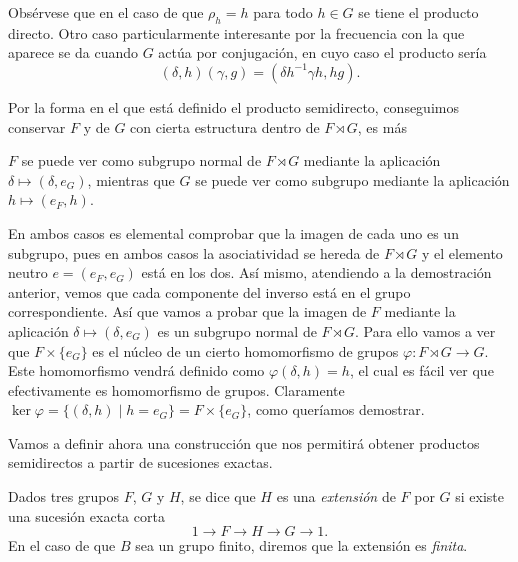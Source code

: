 \documentclass[TFG.tex]{subfiles}
\begin{document}
 Obsérvese que en el caso de que $\rho_h=h$ para todo $h\in G$ se tiene el producto directo. Otro caso particularmente interesante por la frecuencia con la que aparece se da cuando $G$ actúa por conjugación, en cuyo caso el producto sería
\[
(\delta,h)(\gamma,g)=(\delta h^{-1}\gamma h,hg).
\]

Por la forma en el que está definido el producto semidirecto, conseguimos conservar $F$ y de $G$ con cierta estructura dentro de $F\rtimes G$, es más 
\begin{prop}\label{reciproco}
 $F$ se puede ver como subgrupo normal de $F\rtimes G$ mediante la aplicación $\delta\mapsto (\delta,e_G)$, mientras que $G$ se puede ver como subgrupo mediante la aplicación $h\mapsto (e_F,h)$.
\end{prop}
\begin{dem}
En ambos casos es elemental comprobar que la imagen de cada uno es un subgrupo, pues en ambos casos la asociatividad se hereda de $F\rtimes G$ y el elemento neutro $e=(e_F,e_G)$ está en los dos. Así mismo, atendiendo a la demostración anterior, vemos que cada componente del inverso está en el grupo correspondiente. Así que vamos a probar que la imagen de $F$ mediante la aplicación $\delta\mapsto (\delta,e_G)$ es un subgrupo normal de $F\rtimes G$. Para ello vamos a ver que $F\times\{e_G\}$ es el núcleo de un cierto homomorfismo de grupos $\varphi:F\rtimes G\to G$. Este homomorfismo vendrá definido como $\varphi(\delta,h)=h$, el cual es fácil ver que efectivamente es homomorfismo de grupos. Claramente $\ker\varphi=\{(\delta,h)\mid h=e_G\}=F\times\{e_G\}$, como queríamos demostrar. 
\QED
\end{dem}



Vamos a definir ahora una construcción que nos permitirá obtener productos semidirectos a partir de sucesiones exactas.

\begin{defi}
Dados tres grupos $F$, $G$ y $H$, se dice que $H$ es una \emph{extensión} de $F$ por $G$ si existe una sucesión exacta corta
\[
1\to F\to H\to G\to 1.
\]
En el caso de que $B$ sea un grupo finito, diremos que la extensión es \emph{finita}.
\end{defi} 
\end{document}
